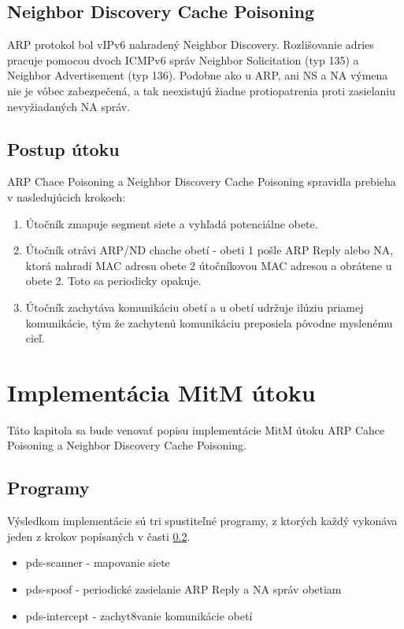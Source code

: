 \documentclass[a4paper,11pt]{article}
\begin{document}
\subsection{Neighbor Discovery Cache Poisoning}
ARP protokol bol vIPv6 nahradený Neighbor Discovery. Rozlišovanie adries pracuje pomocou dvoch ICMPv6 správ Neighbor Solicitation (typ 135) a Neighbor Advertisement (typ 136). Podobne ako u ARP, ani NS a NA výmena nie je vôbec zabezpečená, a tak neexistujú žiadne protiopatrenia proti zasielaniu nevyžiadaných NA správ\cite{Ndp}.

\subsection{Postup útoku} \label{postup}
ARP Chace Poisoning a Neighbor Discovery Cache Poisoning spravidla prebieha v nasledujúcich krokoch\cite{Spf}:
\begin{enumerate}
\item Útočník zmapuje segment siete a vyhľadá potenciálne obete.
\item Útočník otrávi ARP/ND chache obetí - obeti 1 pošle ARP Reply alebo NA, ktorá nahradí MAC adresu obete 2 útočníkovou MAC adresou a obrátene u obete 2. Toto sa periodicky opakuje.
\item Útočník zachytáva komunikáciu obetí a u obetí udržuje ilúziu priamej komunikácie, tým že zachytenú komunikáciu preposiela pôvodne myslenému cieľ.
\end{enumerate}

\newpage

\section{Implementácia MitM útoku}
Táto kapitola sa bude venovať popisu implementácie MitM útoku ARP Cahce Poisoning a Neighbor Discovery Cache Poisoning.

\subsection{Programy} \label{prog}
Výsledkom implementácie sú tri spustiteľné programy, z ktorých každý vykonáva jeden z krokov popísaných v časti \ref{postup}.
\begin{itemize}
\item pds-scanner - mapovanie siete
\item pds-spoof - periodické zasielanie ARP Reply a NA správ obetiam
\item pds-intercept - zachyt8vanie komunikácie obetí
\end{itemize}
\end{document}
